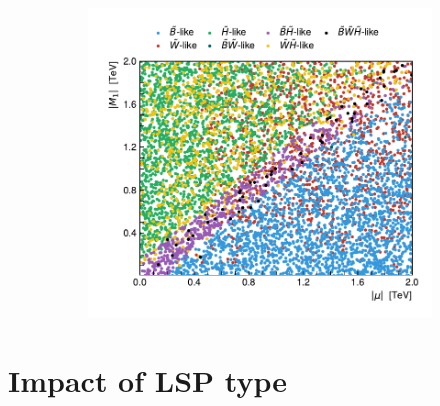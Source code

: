 \begin{figure}
\begin{subfigure}[b]{0.5\linewidth}
		\caption{\label{fig:lsp_types_mu_M2}}
	\end{subfigure}\hfill
	\begin{subfigure}[b]{0.5\linewidth}
		\centering\includegraphics[width=\textwidth]{scatter/lsp_types_mu_M1}
		\caption{\label{fig:lsp_types_mu_M2}}
	\end{subfigure}\hfill
	\caption{}
	\label{fig:lsp_phenomenology_parameters}
\end{figure}



\section{Impact of LSP type}

